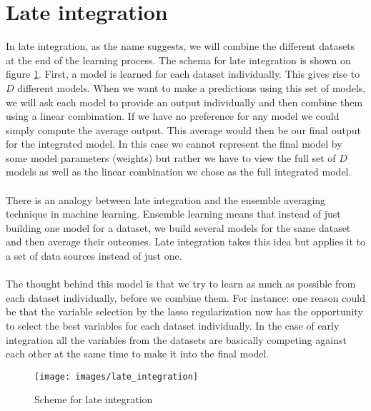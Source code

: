 \section{Late integration}
\label{sec:integration-late}
In late integration, as the name suggests, we will combine the different datasets at the end of the learning process. The schema for late integration is shown on figure \ref{fig:integration-late}. First, a model is learned for each dataset individually. This gives rise to $D$ different models. When we want to make a predictions using this set of models, we will ask each model to provide an output individually and then combine them using a linear combination. If we have no preference for any model we could simply compute the average output. This average would then be our final output for the integrated model. In this case we cannot represent the final model by some model parameters (weights) but rather we have to view the full set of $D$ models as well as the linear combination we chose as the full integrated model. \\ \\
There is an analogy between late integration and the ensemble averaging technique in machine learning. Ensemble learning means that instead of just building one model for a dataset, we build several models for the same dataset and then average their outcomes. Late integration takes this idea but applies it to a set of data sources instead of just one. \\ \\
The thought behind this model is that we try to learn as much as possible from each dataset individually, before we combine them. For instance: one reason could be that the variable selection by the lasso regularization now has the opportunity to select the best variables for each dataset individually. In the case of early integration all the variables from the datasets are basically competing against each other at the same time to make it into the final model.
\begin{figure}
	\centering
	\texttt{[image: images/late\_integration]}
	\caption{Scheme for late integration}
	\label{fig:integration-late}
\end{figure}

